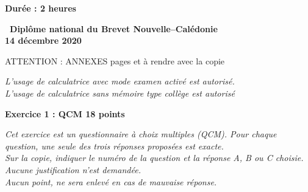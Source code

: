 \documentclass[10pt]{article}
\begin{document}
\setlength\parindent{0mm}
\pagestyle{fancy}
\thispagestyle{empty}

\begin{center}\textbf{Durée : 2 heures}

\vspace{0,5cm}

{\Large\textbf{\decofourleft~Diplôme national du Brevet
Nouvelle--Calédonie~\decofourright}}\\[5pt]
{\Large \textbf{14 décembre 2020}}


\medskip

ATTENTION : ANNEXES pages \pageref{annexe1} et \pageref{annexe2} à rendre avec la copie

\medskip

\emph{L'usage de calculatrice avec mode examen activé est autorisé.\\
L'usage de calculatrice sans mémoire \og type collège \fg{} est autorisé}

\end{center}

\vspace{0,5cm}

\textbf{Exercice 1 : QCM \hfill 18 points}

\medskip

\emph{Cet exercice est un questionnaire à choix multiples (QCM). Pour chaque question, une seule des trois réponses proposées est exacte.\\
Sur la copie, indiquer le numéro de la question et la réponse {\rm A}, {\rm B} ou {\rm C} choisie.\\
Aucune justification n'est demandée.\\
Aucun point, ne sera enlevé en cas de mauvaise réponse.}
\end{document}
